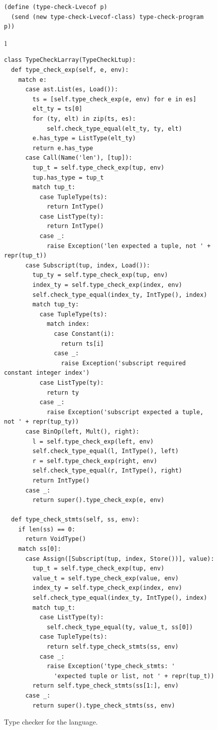 \documentclass[7x10]{TimesAPriori_MIT}%
\def\pythonEd{1}
\def\edition{0}
\numberwithin{theorem}{chapter}
\numberwithin{definition}{chapter}
\numberwithin{equation}{chapter}
\begin{document}
\begin{figure}[tbp]
\begin{tcolorbox}[colback=white]
{\begin{lstlisting}[basicstyle=\ttfamily\footnotesize]
(define (type-check-Lvecof p)
  (send (new type-check-Lvecof-class) type-check-program p))
    \end{lstlisting}
    \fi}
{\if\edition\pythonEd    
\begin{lstlisting}[basicstyle=\ttfamily\footnotesize]
class TypeCheckLarray(TypeCheckLtup):
  def type_check_exp(self, e, env):
    match e:
      case ast.List(es, Load()):
        ts = [self.type_check_exp(e, env) for e in es]
        elt_ty = ts[0]
        for (ty, elt) in zip(ts, es):
            self.check_type_equal(elt_ty, ty, elt)
        e.has_type = ListType(elt_ty)
        return e.has_type
      case Call(Name('len'), [tup]):
        tup_t = self.type_check_exp(tup, env)
        tup.has_type = tup_t
        match tup_t:
          case TupleType(ts):
            return IntType()
          case ListType(ty):
            return IntType()
          case _:
            raise Exception('len expected a tuple, not ' + repr(tup_t))
      case Subscript(tup, index, Load()):
        tup_ty = self.type_check_exp(tup, env)
        index_ty = self.type_check_exp(index, env)
        self.check_type_equal(index_ty, IntType(), index)
        match tup_ty:
          case TupleType(ts):
            match index:
              case Constant(i):
                return ts[i]
              case _:
                raise Exception('subscript required constant integer index')
          case ListType(ty):
            return ty
          case _:
            raise Exception('subscript expected a tuple, not ' + repr(tup_ty))
      case BinOp(left, Mult(), right):
        l = self.type_check_exp(left, env)
        self.check_type_equal(l, IntType(), left)
        r = self.type_check_exp(right, env)
        self.check_type_equal(r, IntType(), right)
        return IntType()
      case _:
        return super().type_check_exp(e, env)

  def type_check_stmts(self, ss, env):
    if len(ss) == 0:
      return VoidType()
    match ss[0]:
      case Assign([Subscript(tup, index, Store())], value):
        tup_t = self.type_check_exp(tup, env)
        value_t = self.type_check_exp(value, env)
        index_ty = self.type_check_exp(index, env)
        self.check_type_equal(index_ty, IntType(), index)
        match tup_t:
          case ListType(ty):
            self.check_type_equal(ty, value_t, ss[0])
          case TupleType(ts):
            return self.type_check_stmts(ss, env)
          case _:
            raise Exception('type_check_stmts: '
              'expected tuple or list, not ' + repr(tup_t))
        return self.type_check_stmts(ss[1:], env)
      case _:
        return super().type_check_stmts(ss, env)
\end{lstlisting}
\fi}
  \end{tcolorbox}

  \caption{Type checker for the \LangArray{} language.}
\label{fig:type-check-Lvecof}
\end{figure}
\end{document}

